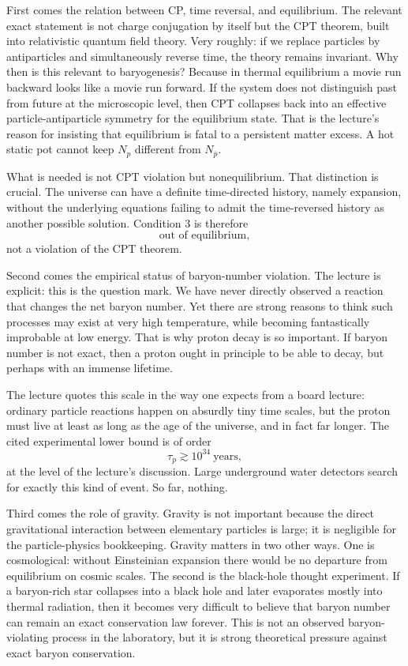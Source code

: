 First comes the relation between CP, time reversal, and equilibrium. The relevant exact statement is not charge conjugation by itself but the CPT theorem, built into relativistic quantum field theory. Very roughly: if we replace particles by antiparticles and simultaneously reverse time, the theory remains invariant. Why then is this relevant to baryogenesis? Because in thermal equilibrium a movie run backward looks like a movie run forward. If the system does not distinguish past from future at the microscopic level, then CPT collapses back into an effective particle-antiparticle symmetry for the equilibrium state. That is the lecture's reason for insisting that equilibrium is fatal to a persistent matter excess. A hot static pot cannot keep \(N_p\) different from \(N_{\bar p}\).

What is needed is not CPT violation but nonequilibrium. That distinction is crucial. The universe can have a definite time-directed history, namely expansion, without the underlying equations failing to admit the time-reversed history as another possible solution. Condition 3 is therefore
\begin{equation}
\text{out of equilibrium},
\end{equation}
not a violation of the CPT theorem.

Second comes the empirical status of baryon-number violation. The lecture is explicit: this is the question mark. We have never directly observed a reaction that changes the net baryon number. Yet there are strong reasons to think such processes may exist at very high temperature, while becoming fantastically improbable at low energy. That is why proton decay is so important. If baryon number is not exact, then a proton ought in principle to be able to decay, but perhaps with an immense lifetime.

The lecture quotes this scale in the way one expects from a board lecture: ordinary particle reactions happen on absurdly tiny time scales, but the proton must live at least as long as the age of the universe, and in fact far longer. The cited experimental lower bound is of order
\begin{equation}
\tau_p \gtrsim 10^{34}\ \text{years},
\end{equation}
at the level of the lecture's discussion. Large underground water detectors search for exactly this kind of event. So far, nothing.

Third comes the role of gravity. Gravity is not important because the direct gravitational interaction between elementary particles is large; it is negligible for the particle-physics bookkeeping. Gravity matters in two other ways. One is cosmological: without Einsteinian expansion there would be no departure from equilibrium on cosmic scales. The second is the black-hole thought experiment. If a baryon-rich star collapses into a black hole and later evaporates mostly into thermal radiation, then it becomes very difficult to believe that baryon number can remain an exact conservation law forever. This is not an observed baryon-violating process in the laboratory, but it is strong theoretical pressure against exact baryon conservation.

